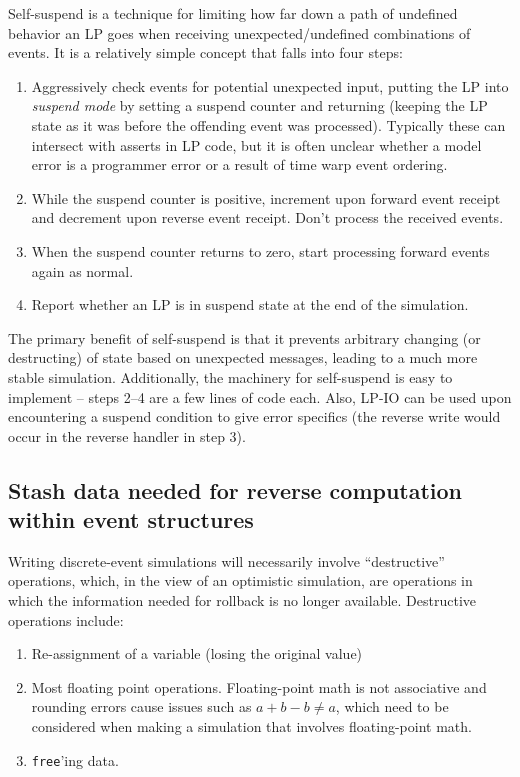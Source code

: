 \documentclass[conference,10pt,compsocconf,onecolumn]{IEEEtran}
\begin{document}
Self-suspend is a technique for limiting how far down a path of undefined
behavior an LP goes when receiving unexpected/undefined combinations of events.
It is a relatively simple concept that falls into four steps:
\begin{enumerate}
    \item Aggressively check events for potential unexpected input, putting the
        LP into \emph{suspend mode} by setting a suspend counter and returning
        (keeping the LP state as it was before the offending event was
        processed). Typically these can intersect with asserts in LP code, but
        it is often unclear whether a model error is a programmer error or a
        result of time warp event ordering.
    \item While the suspend counter is positive, increment upon forward event
        receipt and decrement upon reverse event receipt. Don't process the
        received events.
    \item When the suspend counter returns to zero, start processing forward
        events again as normal.
    \item Report whether an LP is in suspend state at the end of the
        simulation.
\end{enumerate}

The primary benefit of self-suspend is that it prevents arbitrary changing (or
destructing) of state based on unexpected messages, leading to a much more
stable simulation. Additionally, the machinery for self-suspend is easy to
implement -- steps 2--4 are a few lines of code each. Also, LP-IO can be
used upon encountering a suspend condition to give error specifics (the reverse
write would occur in the reverse handler in step 3).

\subsection{Stash data needed for reverse computation within event structures}

Writing discrete-event simulations will necessarily involve ``destructive''
operations, which, in the view of an optimistic simulation, are operations in
which the information needed for rollback is no longer available. Destructive
operations include:
\begin{enumerate}
    \item Re-assignment of a variable (losing the original value)
    \item Most floating point operations. Floating-point math is not
        associative and rounding errors cause issues such as
        $a+b-b \neq a$, which need to be considered when making a simulation
        that involves floating-point math.
    \item \texttt{free}'ing data.
\end{enumerate}
\end{document}
